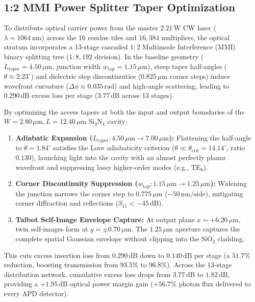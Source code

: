 \documentclass[journal]{IEEEtran}
\begin{document}
\subsection{1:2 MMI Power Splitter Taper Optimization}
To distribute optical carrier power from the master $2.21\,\mathrm{W}$ CW laser ($\lambda = 1064\,\mathrm{nm}$) across the 16 residue tiles and $16,384$ multipliers, the optical stratum incorporates a 13-stage cascaded $1:2$ Multimode Interference (MMI) binary splitting tree ($1:8,192$ division). In the baseline geometry ($L_{\mathrm{taper}} = 4.50\,\mu\mathrm{m}$, junction width $w_{\mathrm{tap}} = 1.15\,\mu\mathrm{m}$), steep taper half-angles ($\theta \approx 2.23^\circ$) and dielectric step discontinuities ($0.825\,\mu\mathrm{m}$ corner steps) induce wavefront curvature ($\Delta \phi \approx 0.035\,\mathrm{rad}$) and high-angle scattering, leading to $0.290\,\mathrm{dB}$ excess loss per stage ($3.77\,\mathrm{dB}$ across 13 stages).

By optimizing the access tapers at both the input and output boundaries of the $W = 2.80\,\mu\mathrm{m}, L = 12.40\,\mu\mathrm{m}$ $\mathrm{Si_3N_4}$ cavity:
\begin{enumerate}
    \item \textbf{Adiabatic Expansion ($L_{\mathrm{taper}}: 4.50\,\mu\mathrm{m} \to 7.00\,\mu\mathrm{m}$):} Flattening the half-angle to $\theta = 1.84^\circ$ satisfies the Love adiabaticity criterion ($\theta \ll \theta_{\mathrm{crit}} = 14.14^\circ$, ratio $0.130$), launching light into the cavity with an almost perfectly planar wavefront and suppressing lossy higher-order modes (e.g., $\mathrm{TE}_6$).
    \item \textbf{Corner Discontinuity Suppression ($w_{\mathrm{tap}}: 1.15\,\mu\mathrm{m} \to 1.25\,\mu\mathrm{m}$):} Widening the junction narrows the corner step to $0.775\,\mu\mathrm{m}$ ($-50\,\mathrm{nm/side}$), mitigating corner diffraction and reflections ($S_{11} < -45\,\mathrm{dB}$).
    \item \textbf{Talbot Self-Image Envelope Capture:} At output plane $x = +6.20\,\mu\mathrm{m}$, twin self-images form at $y = \pm 0.70\,\mu\mathrm{m}$. The $1.25\,\mu\mathrm{m}$ aperture captures the complete spatial Gaussian envelope without clipping into the $\mathrm{SiO_2}$ cladding.
\end{enumerate}
This cuts excess insertion loss from $0.290\,\mathrm{dB}$ down to $\mathbf{0.140\,\mathrm{dB}}$ per stage (a $51.7\%$ reduction, boosting transmission from $93.5\%$ to $96.8\%$). Across the 13-stage distribution network, cumulative excess loss drops from $3.77\,\mathrm{dB}$ to $\mathbf{1.82\,\mathrm{dB}}$, providing a $\mathbf{+1.95\,\mathrm{dB}}$ optical power margin gain ($+56.7\%$ photon flux delivered to every APD detector).
\end{document}
